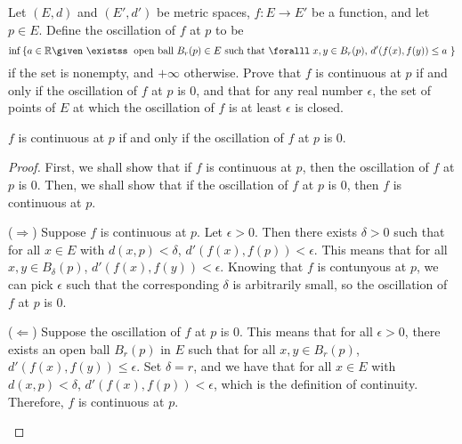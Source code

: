\begin{problem}
  Let $(E, d)$ and $(E', d')$ be metric spaces, $f : E \to E'$ be a function,
  and let $p \in E$. Define the oscillation of $f$ at $p$ to be
  \[
    \inf \set{
      a \in \R \given
      \text{
        $\exists$ open ball $B_r(p) \in E$
        such that $\forall x, y \in B_r(p)$,
        $d'(f(x), f(y)) \leq a$
      }
    } \]
    if the set is nonempty, and $+\infty$ otherwise.
    Prove that $f$ is continuous at $p$ if and only if the oscillation of $f$ at $p$ is $0$,
    and that for any real number $\epsilon$, the set of points of $E$
    at which the oscillation of $f$ is at least $\epsilon$ is closed.
\end{problem}
\begin{answer}
  \begin{claim}
    $f$ is continuous at $p$ if and only if the oscillation of $f$ at $p$ is $0$.
    \begin{proof}
      First, we shall show that if $f$ is continuous at $p$, then the oscillation of $f$ at $p$ is $0$.
      Then, we shall show that if the oscillation of $f$ at $p$ is $0$, then $f$ is continuous at $p$.
      \begin{enumarabic}
        \item ($\Rightarrow$)
          Suppose $f$ is continuous at $p$.
          Let $\epsilon > 0$.
          Then there exists $\delta > 0$ such that
          for all $x \in E$ with $d(x, p) < \delta$,
          $d'(f(x), f(p)) < \epsilon$.
          This means that for all $x, y \in B_\delta(p)$, $d'(f(x), f(y)) < \epsilon$.
          Knowing that $f$ is contunyous at $p$, we can pick $\epsilon$ such that
          the corresponding $\delta$ is arbitrarily small, so the oscillation of $f$ at $p$ is $0$.
        \item ($\Leftarrow$)
          Suppose the oscillation of $f$ at $p$ is $0$.
          This means that for all $\epsilon > 0$, there exists an open ball $B_r(p)$ in $E$ such that
          for all $x, y \in B_r(p)$, $d'(f(x), f(y)) \leq \epsilon$.
          Set $\delta = r$, and we have that for all $x \in E$ with $d(x, p) < \delta$,
          $d'(f(x), f(p)) < \epsilon$, which is the definition of continuity.
          Therefore, $f$ is continuous at $p$.
      \end{enumarabic}
    \end{proof}
  \end{claim}


\end{answer}
